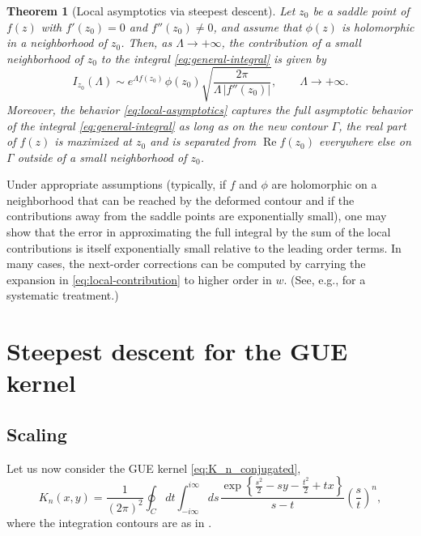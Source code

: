 \documentclass[letterpaper,11pt,oneside,reqno]{article}
\numberwithin{equation}{section}
\newcommand{\ssp}{\hspace{1pt}}
\newtheorem{theorem}[proposition]{Theorem}
\theoremstyle{definition}
\begin{document}
\begin{theorem}[Local asymptotics via steepest descent]
	\label{thm:steepest-descent}
	Let $z_0$ be a saddle point of $f(z)$ with $f'(z_0)=0$ and $f''(z_0)\neq 0$, and assume that $\phi(z)$ is holomorphic in a neighborhood of $z_0$. Then, as $\Lambda\to+\infty$, the contribution of a small neighborhood of $z_0$ to the integral \eqref{eq:general-integral} is given by
	\begin{equation}
		\label{eq:local-asymptotics}
		I_{z_0}(\Lambda)
		\sim e^{\Lambda f(z_0)}\ssp \phi(z_0)
		\sqrt{\frac{2\pi}{\Lambda\,|f''(z_0)|}},\qquad \Lambda\to+\infty.
	\end{equation}
	Moreover, the behavior \eqref{eq:local-asymptotics}
	captures the full asymptotic behavior of the
	integral \eqref{eq:general-integral}
	as long as on the new contour $\Gamma$,
	the real part of $f(z)$ is maximized at $z_0$ and is separated
	from $\operatorname{Re}f(z_0)$ everywhere else on $\Gamma$ outside of a
	small neighborhood of $z_0$.
\end{theorem}

Under appropriate assumptions (typically, if $f$ and $\phi$ are holomorphic on a neighborhood that can be reached by the deformed contour and if the contributions away from the saddle points are exponentially small), one may show that the error in approximating the full integral by the sum of the local contributions is itself exponentially small relative to the leading order terms. In many cases, the next-order corrections can be computed by carrying the expansion in \eqref{eq:local-contribution} to higher order in $w$. (See, e.g., \cite{olver1974asymptotics} for a systematic treatment.)




\section{Steepest descent for the GUE kernel}
\label{sec:steepest-descent-GUE}

\subsection{Scaling}
\label{sub:scaling}

Let us now consider the GUE kernel
\eqref{eq:K_n_conjugated},
\begin{equation*}
	K_n(x,y)=\frac{1}{(2\pi)^2}
	\oint_C dt\int_{-i\infty}^{i\infty}ds\ssp
	\frac{\exp\left\{ \frac{s^2}{2}-sy-\frac{t^2}{2}+tx \right\}}{s-t}\left( \frac{s}{t} \right)^n
	,
\end{equation*}
where the integration contours are as in .
\end{document}
